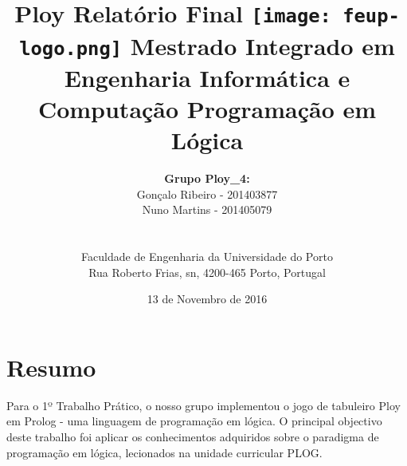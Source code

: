 \documentclass[a4paper]{article}
\begin{document}
\setlength{\textwidth}{16cm}
\setlength{\textheight}{22cm}

\title{\Huge\textbf{Ploy}\linebreak\linebreak\linebreak
\Large\textbf{Relatório Final}\linebreak\linebreak
\linebreak\linebreak
\texttt{[image: feup-logo.png]}\linebreak\linebreak
\linebreak\linebreak
\Large{Mestrado Integrado em Engenharia Informática e Computação} \linebreak\linebreak
\Large{Programação em Lógica}\linebreak
}

\author{\textbf{Grupo Ploy\_4:}\\ Gonçalo Ribeiro - 201403877 \\ Nuno Martins - 201405079 \\\linebreak\linebreak \\
 \\ Faculdade de Engenharia da Universidade do Porto \\ Rua Roberto Frias, s\/n, 4200-465 Porto, Portugal \linebreak\linebreak\linebreak
\linebreak\linebreak\vspace{1cm}}
\date{13 de Novembro de 2016}
\maketitle
\thispagestyle{empty}


\newpage

\section*{Resumo}
Para o 1º Trabalho Prático, o nosso grupo implementou o jogo de tabuleiro Ploy em Prolog - uma linguagem de programação em lógica.
O principal objectivo deste trabalho foi aplicar os conhecimentos adquiridos sobre o paradigma de programação em lógica, lecionados na unidade curricular PLOG.
\end{document}
